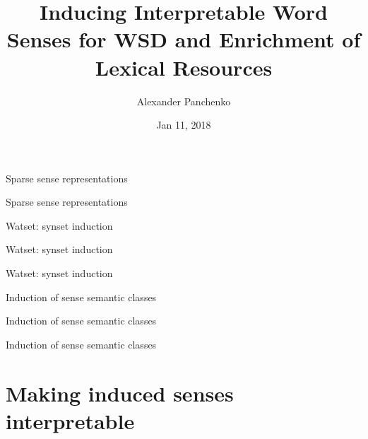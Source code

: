 \documentclass[usenames,dvipsnames]{beamer}
\title{Inducing Interpretable Word Senses for WSD and Enrichment of Lexical Resources}
\author{Alexander Panchenko}
\date[11.02.2018]{Jan 11, 2018}
\begin{document}
\maketitle

% 
% 

\begin{frame}{Sparse sense representations}
	
\end{frame}


\begin{frame}{Sparse sense representations}
	
\end{frame}

\begin{frame}{Watset: synset induction}
	
\end{frame}


\begin{frame}{Watset: synset induction}
	
\end{frame}


\begin{frame}{Watset: synset induction}
	
\end{frame}


\begin{frame}{Induction of sense semantic classes}
	
\end{frame}

\begin{frame}{Induction of sense semantic classes}
	
\end{frame}

\begin{frame}{Induction of sense semantic classes}
	
\end{frame}

\section{Making induced senses interpretable}
\end{document}
